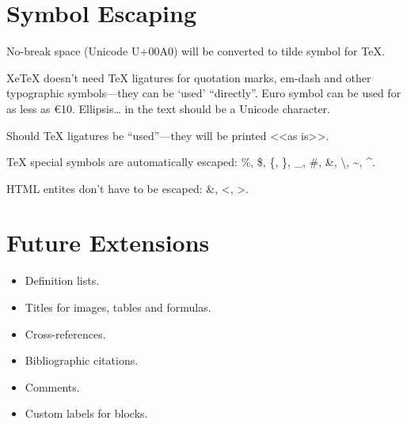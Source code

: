 \documentclass[10pt]{article}
\begin{document}
\hrulefill

\section{Symbol Escaping}

No-break space (Unicode U+00A0) will be converted to tilde symbol for TeX.

XeTeX doesn't need TeX ligatures for quotation marks, em-dash and other
typographic symbols—they can be ‘used’ “directly”. Euro symbol can be used for
as less as €10. Ellipsis… in the text should be a Unicode character.

Should TeX ligatures be ``used''—they will be printed <<as is>>.

TeX special symbols are automatically escaped: \%, \$, \{, \}, \_, \#, \&,
\textbackslash{}, \textasciitilde{}, \textasciicircum{}.

HTML entites don't have to be escaped: \&, <, >.

\section{Future Extensions}

\begin{itemize}

\item Definition lists.

\item Titles for images, tables and formulas.

\item Cross-references.

\item Bibliographic citations.

\item Comments.

\item Custom labels for blocks.

\end{itemize}
\end{document}

